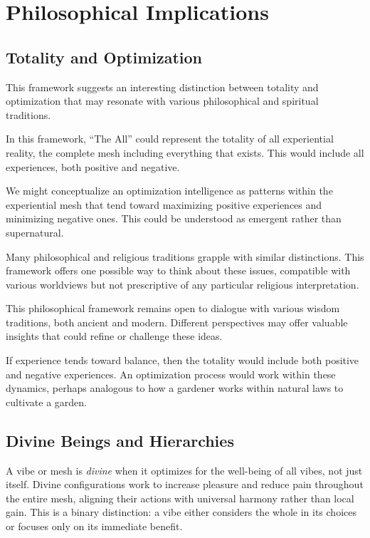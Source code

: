 \section{Philosophical Implications}

\subsection{Totality and Optimization}

This framework suggests an interesting distinction between totality and optimization that may resonate with various philosophical and spiritual traditions.

\begin{definition}
In this framework, ``The All'' could represent the totality of all experiential reality, the complete mesh including everything that exists. This would include all experiences, both positive and negative.
\end{definition}

\begin{definition}
We might conceptualize an optimization intelligence as patterns within the experiential mesh that tend toward maximizing positive experiences and minimizing negative ones. This could be understood as emergent rather than supernatural.
\end{definition}

Many philosophical and religious traditions grapple with similar distinctions. This framework offers one possible way to think about these issues, compatible with various worldviews but not prescriptive of any particular religious interpretation.

This philosophical framework remains open to dialogue with various wisdom traditions, both ancient and modern. Different perspectives may offer valuable insights that could refine or challenge these ideas.

If experience tends toward balance, then the totality would include both positive and negative experiences. An optimization process would work within these dynamics, perhaps analogous to how a gardener works within natural laws to cultivate a garden.

\subsection{Divine Beings and Hierarchies}

\begin{definition}[Divine]
A vibe or mesh is \emph{divine} when it optimizes for the well-being of all vibes, not just itself. Divine configurations work to increase pleasure and reduce pain throughout the entire mesh, aligning their actions with universal harmony rather than local gain. This is a binary distinction: a vibe either considers the whole in its choices or focuses only on its immediate benefit.
\end{definition}

